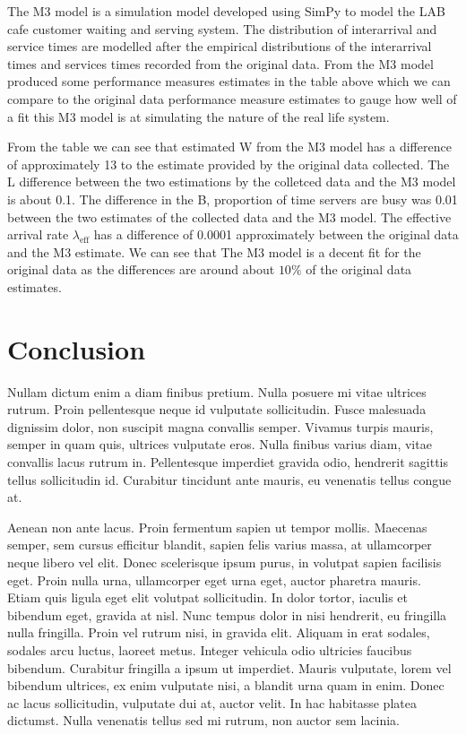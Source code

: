 \documentclass{article}
\begin{document}
The M3 model is a simulation model developed using SimPy to model the LAB cafe customer waiting and serving system. The distribution of interarrival and service times are modelled after the empirical distributions of the interarrival times and services times recorded from the original data. From the M3 model produced some performance measures estimates in the table above which we can compare to the original data performance measure estimates to gauge how well of a fit this M3 model is at simulating the nature of the real life system.

From the table we can see that estimated W from the M3 model has a difference of approximately 13 to the estimate provided by the original data collected. The L difference between the two estimations by the colletced data and the M3 model is about 0.1. The difference in the B, proportion of time servers are busy was 0.01 between the two estimates of the collected data and the M3 model. The effective arrival rate $\lambda_{\text{eff}}$ has a difference of 0.0001 approximately between the original data and the M3 estimate. We can see that The M3 model is a decent fit for the original data as the differences are around about $10\%$ of the original data estimates.

\section{Conclusion}

Nullam dictum enim a diam finibus pretium. Nulla posuere mi vitae ultrices rutrum. Proin pellentesque neque id vulputate sollicitudin. Fusce malesuada dignissim dolor, non suscipit magna convallis semper. Vivamus turpis mauris, semper in quam quis, ultrices vulputate eros. Nulla finibus varius diam, vitae convallis lacus rutrum in. Pellentesque imperdiet gravida odio, hendrerit sagittis tellus sollicitudin id. Curabitur tincidunt ante mauris, eu venenatis tellus congue at.

Aenean non ante lacus. Proin fermentum sapien ut tempor mollis. Maecenas semper, sem cursus efficitur blandit, sapien felis varius massa, at ullamcorper neque libero vel elit. Donec scelerisque ipsum purus, in volutpat sapien facilisis eget. Proin nulla urna, ullamcorper eget urna eget, auctor pharetra mauris. Etiam quis ligula eget elit volutpat sollicitudin. In dolor tortor, iaculis et bibendum eget, gravida at nisl. Nunc tempus dolor in nisi hendrerit, eu fringilla nulla fringilla. Proin vel rutrum nisi, in gravida elit. Aliquam in erat sodales, sodales arcu luctus, laoreet metus. Integer vehicula odio ultricies faucibus bibendum. Curabitur fringilla a ipsum ut imperdiet. Mauris vulputate, lorem vel bibendum ultrices, ex enim vulputate nisi, a blandit urna quam in enim. Donec ac lacus sollicitudin, vulputate dui at, auctor velit. In hac habitasse platea dictumst. Nulla venenatis tellus sed mi rutrum, non auctor sem lacinia.
\end{document}
